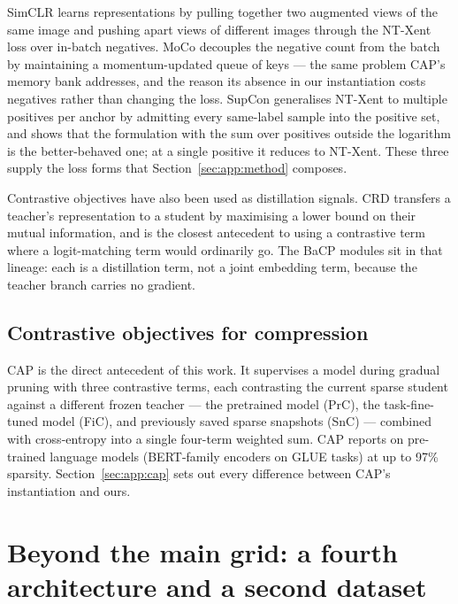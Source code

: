 SimCLR \citep{chen2020simclr} learns representations by pulling together two
augmented views of the same image and pushing apart views of different images
through the NT-Xent loss over in-batch negatives. MoCo \citep{he2020moco}
decouples the negative count from the batch by maintaining a momentum-updated
queue of keys --- the same problem CAP's memory bank addresses, and the reason
its absence in our instantiation costs negatives rather than changing the loss.
SupCon \citep{khosla2020supcon} generalises NT-Xent to multiple positives per
anchor by admitting every same-label sample into the positive set, and shows that
the formulation with the sum over positives outside the logarithm is the
better-behaved one; at a single positive it reduces to NT-Xent. These three
supply the loss forms that Section~\ref{sec:app:method} composes.

Contrastive objectives have also been used as distillation signals. CRD
\citep{tian2020crd} transfers a teacher's representation to a student by
maximising a lower bound on their mutual information, and is the closest
antecedent to using a contrastive term where a logit-matching term
\citep{hinton2015distilling} would ordinarily go. The BaCP modules sit in that
lineage: each is a distillation term, not a joint embedding term, because the
teacher branch carries no gradient.

\subsection{Contrastive objectives for compression}

CAP \citep{xu2022cap} is the direct antecedent of this work. It supervises a
model during gradual pruning with three contrastive terms, each contrasting the
current sparse student against a different frozen teacher --- the pretrained
model (PrC), the task-fine-tuned model (FiC), and previously saved sparse
snapshots (SnC) --- combined with cross-entropy into a single four-term weighted
sum. CAP reports on pre-trained language models (BERT-family encoders on GLUE
tasks) at up to 97\% sparsity. Section~\ref{sec:app:cap} sets out every
difference between CAP's instantiation and ours.


\section{Beyond the main grid: a fourth architecture and a second dataset}
\label{app:beyond}

